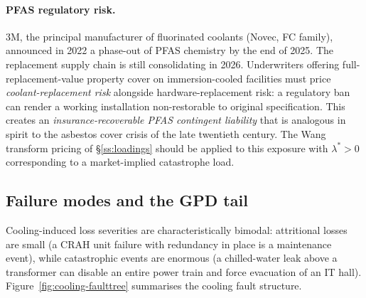 \paragraph{PFAS regulatory risk.}
3M, the principal manufacturer of fluorinated coolants
(Novec, FC family), announced in 2022 a phase-out of PFAS chemistry
by the end of 2025. The replacement supply chain is still
consolidating in 2026. Underwriters offering full-replacement-value
property cover on immersion-cooled facilities must price
\emph{coolant-replacement risk} alongside hardware-replacement
risk: a regulatory ban can render a working installation
non-restorable to original specification. This creates an
\emph{insurance-recoverable PFAS contingent liability} that is
analogous in spirit to the asbestos cover crisis of the late
twentieth century. The Wang transform pricing of
\S\ref{ss:loadings} should be applied to this exposure with
$\lambda^*>0$ corresponding to a market-implied catastrophe load.

\subsection{Failure modes and the GPD tail}\label{ss:cool-failure}

Cooling-induced loss severities are characteristically bimodal:
attritional losses are small (a CRAH unit failure with redundancy in
place is a maintenance event), while catastrophic events are
enormous (a chilled-water leak above a transformer can disable an
entire power train and force evacuation of an IT hall).
Figure~\ref{fig:cooling-faulttree} summarises the cooling fault
structure.

